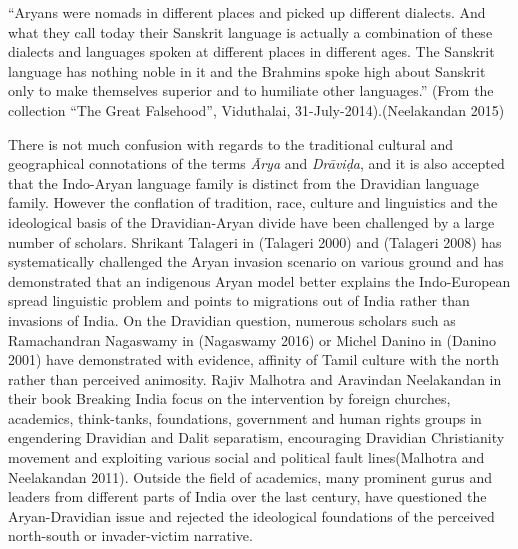 \begin{myquote}
“Aryans were nomads in different places and picked up different dialects. And what they call today their Sanskrit language is actually a combination of these dialects and languages spoken at different places in different ages. The Sanskrit language has nothing noble in it and the Brahmins spoke high about Sanskrit only to make themselves superior and to humiliate other languages.” (From the collection “The Great Falsehood”, Viduthalai, 31-July-2014).(Neelakandan 2015)
\end{myquote}

There is not much confusion with regards to the traditional cultural and geographical connotations of the terms \textit{Ārya} and \textit{Drāviḍa}, and it is also accepted that the Indo-Aryan language family is distinct from the Dravidian language family. However the conflation of tradition, race, culture and linguistics and the ideological basis of the Dravidian-Aryan divide have been challenged by a large number of scholars. Shrikant Talageri in (Talageri 2000) and (Talageri 2008) has systematically challenged the Aryan invasion scenario on various ground and has demonstrated that an indigenous Aryan model better explains the Indo-European spread linguistic problem and points to migrations out of India rather than invasions of India. On the Dravidian question, numerous scholars such as Ramachandran Nagaswamy in (Nagaswamy 2016) or Michel Danino in (Danino 2001) have demonstrated with evidence, affinity of Tamil culture with the north rather than perceived animosity. Rajiv Malhotra and Aravindan Neelakandan in their book Breaking India focus on the intervention by foreign churches, academics, think-tanks, foundations, government and human rights groups in engendering Dravidian and Dalit separatism, encouraging Dravidian Christianity movement and exploiting various social and political fault lines(Malhotra and Neelakandan 2011). Outside the field of academics, many prominent gurus and leaders from different parts of India over the last century, have questioned the Aryan-Dravidian issue and rejected the ideological foundations of the perceived north-south or invader-victim narrative.

\newpage

